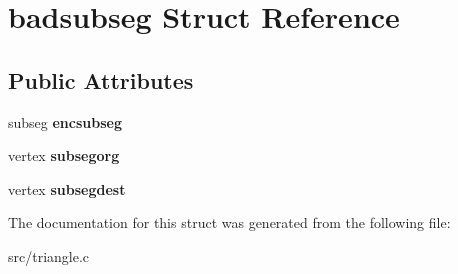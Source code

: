\hypertarget{structbadsubseg}{
\section{badsubseg Struct Reference}
\label{structbadsubseg}
}
\subsection*{Public Attributes}
\begin{DoxyCompactItemize}
\item 
\hypertarget{structbadsubseg_ad48ae5d8b70757545ba8f6fe33143b64}{
subseg {\bfseries encsubseg}}
\label{structbadsubseg_ad48ae5d8b70757545ba8f6fe33143b64}

\item 
\hypertarget{structbadsubseg_ac06bcfaa89508ea06c7f4c003c74d463}{
vertex {\bfseries subsegorg}}
\label{structbadsubseg_ac06bcfaa89508ea06c7f4c003c74d463}

\item 
\hypertarget{structbadsubseg_a8ca4f27968ded45a43c39be9b7e40770}{
vertex {\bfseries subsegdest}}
\label{structbadsubseg_a8ca4f27968ded45a43c39be9b7e40770}

\end{DoxyCompactItemize}


The documentation for this struct was generated from the following file:\begin{DoxyCompactItemize}
\item 
src/triangle.c\end{DoxyCompactItemize}
